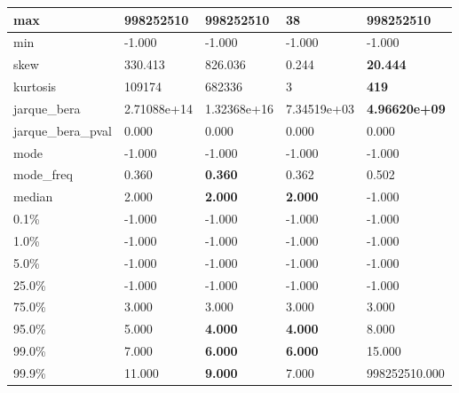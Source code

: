 \begin{table}[H]
\begin{tabular}{|l|m{10em}|m{10em}|m{10em}|m{10em}|}
\hline max & 998252510 & \bfseries 998252510 & \cellcolor[rgb]{0.9, 0.54, 0.52} 38 & \bfseries 998252510 \\
\hline min & -1.000 & -1.000 & -1.000 & -1.000 \\
\hline skew & 330.413 & \cellcolor[rgb]{0.9, 0.54, 0.52} 826.036 & 0.244 & \bfseries 20.444 \\
\hline kurtosis & 109174 & \cellcolor[rgb]{0.9, 0.54, 0.52} 682336 & 3 & \bfseries 419 \\
\hline jarque\_bera & 2.71088e+14 & \cellcolor[rgb]{0.9, 0.54, 0.52} 1.32368e+16 & 7.34519e+03 & \bfseries 4.96620e+09 \\
\hline jarque\_bera\_pval & 0.000 & 0.000 & 0.000 & 0.000 \\
\hline mode & -1.000 & -1.000 & -1.000 & -1.000 \\
\hline mode\_freq & 0.360 & \bfseries 0.360 & 0.362 & \cellcolor[rgb]{0.9, 0.54, 0.52} 0.502 \\
\hline median & 2.000 & \bfseries 2.000 & \bfseries 2.000 & \cellcolor[rgb]{0.9, 0.54, 0.52} -1.000 \\
\hline 0.1\% & -1.000 & -1.000 & -1.000 & -1.000 \\
\hline 1.0\% & -1.000 & -1.000 & -1.000 & -1.000 \\
\hline 5.0\% & -1.000 & -1.000 & -1.000 & -1.000 \\
\hline 25.0\% & -1.000 & -1.000 & -1.000 & -1.000 \\
\hline 75.0\% & 3.000 & 3.000 & 3.000 & 3.000 \\
\hline 95.0\% & 5.000 & \bfseries 4.000 & \bfseries 4.000 & \cellcolor[rgb]{0.9, 0.54, 0.52} 8.000 \\
\hline 99.0\% & 7.000 & \bfseries 6.000 & \bfseries 6.000 & \cellcolor[rgb]{0.9, 0.54, 0.52} 15.000 \\
\hline 99.9\% & 11.000 & \bfseries 9.000 & 7.000 & \cellcolor[rgb]{0.9, 0.54, 0.52} 998252510.000 \\
\hline
\end{tabular}
\end{table}

